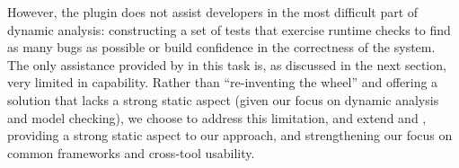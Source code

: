 However, the \eacsl plugin does not assist developers in the most difficult part of dynamic analysis:  constructing a set of tests that exercise runtime checks to find as many bugs as possible or build confidence in the correctness of the system.  The only assistance provided by \framac in this task is, as discussed in the next section, very limited in capability.  Rather than ``re-inventing the wheel'' and offering a solution that lacks a strong static aspect (given our focus on dynamic analysis and model checking), we choose to address this limitation, and extend \acsl and \eacsl, providing a strong static aspect to our approach, and strengthening our focus on common frameworks and cross-tool usability. 
